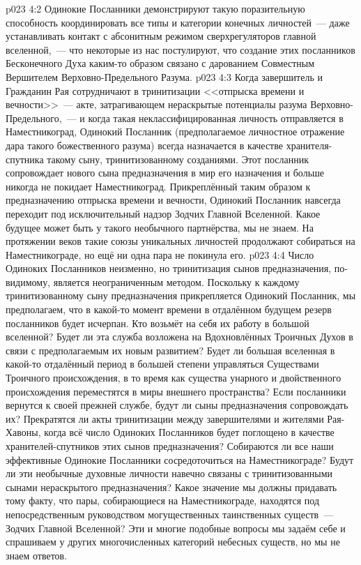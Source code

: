 \vs p023 4:2 Одинокие Посланники демонстрируют такую поразительную способность координировать все типы и категории конечных личностей~--- даже устанавливать контакт с абсонитным режимом сверхрегуляторов главной вселенной,~--- что некоторые из нас постулируют, что создание этих посланников Бесконечного Духа каким\hyp{}то образом связано с дарованием Совместным Вершителем Верховно\hyp{}Предельного Разума.
\vs p023 4:3 \pc Когда завершитель и Гражданин Рая сотрудничают в тринитизации <<отпрыска времени и вечности>>~--- акте, затрагивающем нераскрытые потенциалы разума Верховно\hyp{}Предельного,~--- и когда такая неклассифицированная личность отправляется в Наместникоград, Одинокий Посланник (предполагаемое личностное отражение дара такого божественного разума) всегда назначается в качестве хранителя\hyp{}спутника такому сыну, тринитизованному созданиями. Этот посланник сопровождает нового сына предназначения в мир его назначения и больше никогда не покидает Наместникоград. Прикреплённый таким образом к предназначению отпрыска времени и вечности, Одинокий Посланник навсегда переходит под исключительный надзор Зодчих Главной Вселенной. Какое будущее может быть у такого необычного партнёрства, мы не знаем. На протяжении веков такие союзы уникальных личностей продолжают собираться на Наместникограде, но ещё ни одна пара не покинула его.
\vs p023 4:4 Число Одиноких Посланников неизменно, но тринитизация сынов предназначения, по\hyp{}видимому, является неограниченным методом. Поскольку к каждому тринитизованному сыну предназначения прикрепляется Одинокий Посланник, мы предполагаем, что в какой\hyp{}то момент времени в отдалённом будущем резерв посланников будет исчерпан. Кто возьмёт на себя их работу в большой вселенной? Будет ли эта служба возложена на Вдохновлённых Троичных Духов в связи с предполагаемым их новым развитием? Будет ли большая вселенная в какой\hyp{}то отдалённый период в большей степени управляться Существами Троичного происхождения, в то время как существа унарного и двойственного происхождения переместятся в миры внешнего пространства? Если посланники вернутся к своей прежней службе, будут ли сыны предназначения сопровождать их? Прекратятся ли акты тринитизации между завершителями и жителями Рая\hyp{}Хавоны, когда всё число Одиноких Посланников будет поглощено в качестве хранителей\hyp{}спутников этих сынов предназначения? Собираются ли все наши эффективные Одинокие Посланники сосредоточиться на Наместникограде? Будут ли эти необычные духовные личности навечно связаны с тринитизованными сынами нераскрытого предназначения? Какое значение мы должны придавать тому факту, что пары, собирающиеся на Наместникограде, находятся под непосредственным руководством могущественных таинственных существ~--- Зодчих Главной Вселенной? Эти и многие подобные вопросы мы задаём себе и спрашиваем у других многочисленных категорий небесных существ, но мы не знаем ответов.

